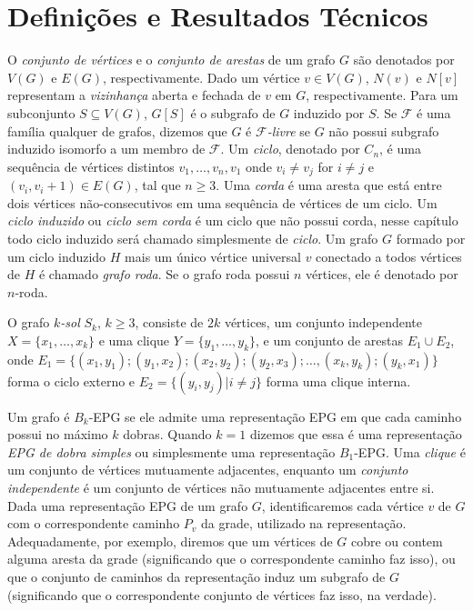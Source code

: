 \section{Definições e Resultados Técnicos}

O \textit{conjunto de vértices} e o \textit{conjunto de arestas} de um grafo  $G$ são denotados por $V(G)$ e $E(G)$, respectivamente.  Dado um vértice  $v\in V(G)$,  $N(v)$ e $N[v]$ representam a   \textit{vizinhança} aberta e fechada de  $v$ em $G$, respectivamente. 
Para um subconjunto  $S \subseteq V(G)$,  $G[S]$ é o subgrafo de $G$ induzido por $S$.
 Se $\mathcal{F}$ é uma família qualquer de grafos, dizemos que $G$ é  \textit{$\mathcal{F}$-livre} se $G$ não possui subgrafo induzido isomorfo a um membro de $\mathcal{F}$.
 Um \textit{ciclo},  denotado por $C_n$, é uma sequência de vértices distintos  $v_1, \dots , v_n, v_1$  onde $v_i \neq v_j$ for $i \neq j$ e $(v_i, v_i + 1) \in E(G)$, tal que $n \geq 3$. Uma \textit{corda} é uma aresta que está entre dois vértices não-consecutivos em uma sequência de vértices de um ciclo. Um \textit{ciclo induzido}  ou \textit{ciclo sem corda} é um ciclo que não possui corda, nesse capítulo todo ciclo induzido será chamado simplesmente de  \textit{ciclo}. Um grafo  $G$ formado por um ciclo induzido $H$ mais um único vértice universal  $v$ conectado a todos vértices de $H$ é chamado  \textit{grafo roda}. Se o grafo roda possui $n$ vértices, ele é denotado por $n$-roda. 

O grafo $k$\textit{-sol} $S_k$, $k \geq 3$, consiste de 
$2k$ vértices, um conjunto independente $X = \{x_1, \dots, x_k\}$ e uma clique $Y = \{y_1, \dots, y_k\}$, e um conjunto de arestas $E_1 \cup E_2$, onde $E_ 1=\{ (x_1,y_1); (y_1, x_2); (x_2, y_2); (y_2, x_3); \dots , (x_k, y_k); (y_k, x_1) \}$ forma o ciclo externo e $E_2= \{(y_i, y_j) |i\neq j\}$ forma uma clique interna.

Um grafo é $ B_k$-EPG se ele admite uma representação EPG em que cada caminho possui no máximo $k$ dobras. Quando $ k = 1 $ dizemos que essa é uma representação \emph{ EPG de dobra simples} ou simplesmente uma representação  $B_1$-EPG. 
Uma \textit{clique} é um conjunto de vértices mutuamente adjacentes, enquanto
um \textit{conjunto independente} é um conjunto de vértices não mutuamente adjacentes entre si.
 Dada uma representação EPG de um grafo  $G$, identificaremos cada vértice  $v$ de $G$ com o correspondente caminho  $P_{v}$ da grade, utilizado na representação. Adequadamente, por exemplo, diremos que um vértices de  $G$ cobre ou contem alguma aresta da grade (significando que o correspondente caminho faz isso), ou que o conjunto de caminhos da representação induz um subgrafo de $G$ (significando que o correspondente conjunto de vértices faz isso, na verdade). 

